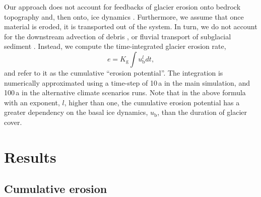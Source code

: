 \documentclass[esurf, manuscript]{copernicus}
\begin{document}
    Our approach does not account for feedbacks of glacier erosion onto
    bedrock topography and, then onto, ice dynamics
    \citep[e.g.,][]{Anderson.etal.2012}. Furthermore, we assume that once
    material is eroded, it is transported out of the system. In turn, we do not
    account for the downstream advection of debris
    \citep[e.g.,][]{Anderson.Anderson.2016}, or fluvial transport of subglacial
    sediment \citep{Delaney.etal.2019}. Instead, we compute the
    time-integrated glacier erosion rate,
    \begin{equation}
        e =  K_\mathrm{g} \int u_\mathrm{b}^l dt,
    \end{equation}
    and refer to it as the cumulative ``erosion potential''. The integration
    is numerically approximated using a time-step of 10\,a in the
    main simulation, and 100\,a in the alternative climate scenarios runs.
    Note that in the above formula with an exponent, $l$,
    higher than one, the cumulative erosion potential has a greater dependency
    on the basal ice dynamics, $u_\mathrm{b}$, than the duration of glacier
    cover.


\section{Results}

\subsection{Cumulative erosion}
\end{document}
